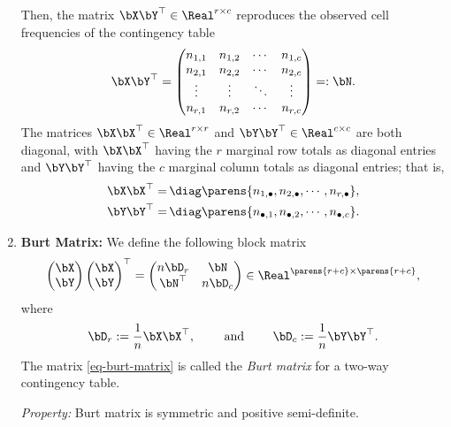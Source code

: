 \documentclass[12pt]{article}
\begin{document}
\begin{enumerate}[label=\textbf{\arabic*.}]
	Then, the matrix $\bX \bY^\top \in \Real^{r \times c}$ reproduces the observed cell frequencies of the contingency table 
	\begin{align}\label{eq-N}
		\bX \bY^\top = \begin{pmatrix}
			n_{1,1} & n_{1,2} & \cdots & n_{1, c} \\ 
			n_{2,1} & n_{2,2} & \cdots & n_{2, c} \\ 
			\vdots & \vdots & \ddots & \vdots \\ 
			n_{r,1} & n_{r,2} & \cdots & n_{r, c} \\ 
		\end{pmatrix} =: \bN. 
	\end{align}
	The matrices $\bX \bX^{\top} \in \Real^{r \times r}$ and $\bY \bY^{\top} \in \Real^{c \times c}$ are both diagonal, with $\bX \bX^{\top}$ having the $r$ marginal row totals as diagonal entries  and $\bY \bY^\top$ having the $c$ marginal column totals as diagonal entries; that is, 
	\begin{align*}
		\bX \bX^\top = & \, \diag \parens{n_{1,\bullet}, n_{2,\bullet}, \cdots, n_{r,\bullet}}, \\ 
		\bY \bY^\top = & \, \diag \parens{n_{\bullet,1}, n_{\bullet,2}, \cdots, n_{\bullet,c}}. 
	\end{align*}
	
	\item \textbf{Burt Matrix:} We define the following block matrix 
	\begin{align}\label{eq-burt-matrix}
		\begin{pmatrix}
			\bX \\ \bY
		\end{pmatrix} 
		\begin{pmatrix}
			\bX \\ \bY
		\end{pmatrix}^\top = \begin{pmatrix}
			n \bD_r & \bN \\ 
			\bN^\top & n \bD_c
		\end{pmatrix} \in \Real^{\parens{r+c} \times \parens{r+c}}, 
	\end{align}
	where 
	\begin{align*}
		\bD_r := \frac{1}{n} \bX \bX^\top, \qquad \text{ and } \qquad \bD_c := \frac{1}{n} \bY \bY^\top. 
	\end{align*}
	The matrix \eqref{eq-burt-matrix} is called the \emph{Burt matrix} for a two-way contingency table. 
	
	\textit{Property:} Burt matrix is symmetric and positive semi-definite. 
	

\end{enumerate}
\end{document}
